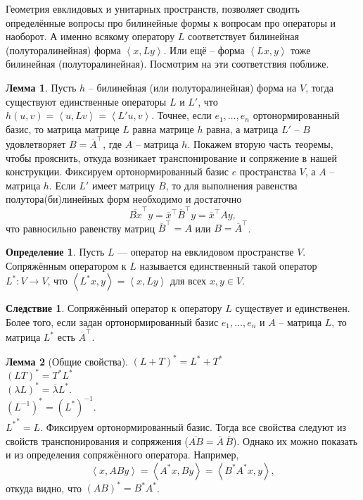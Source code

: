 \documentclass[10pt,a4paper,oneside]{book} %
\theoremstyle{definition}
\newtheorem*{defn}{Определение}
\newtheorem{lem}{Лемма}
\newtheorem{cor}{Следствие}
\newcommand{\ovl}{\overline}
\def\lan{\left\langle }
\def\ran{\right\rangle}
\def\dfn{\begin{defn}}
\def\edfn{\end{defn}}
\def\lm{\begin{lem}}
\def\elm{\end{lem}}
\def\crl{\begin{cor}}
\def\ecrl{\end{cor}}
\begin{document}
Геометрия евклидовых и унитарных пространств, позволяет сводить определённые вопросы про билинейные формы к вопросам про операторы и наоборот. А именно всякому оператору $L$ соответствует билинейная (полуторалинейная) форма $\lan x,Ly\ran$. Или ещё -- форма $\lan Lx,y\ran$ тоже билинейная (полуторалинейная). Посмотрим на эти соответствия поближе.

\lm Пусть $h$ -- билинейная (или полуторалинейная) форма на $V$, тогда существуют единственные операторы $L$ и $L'$, что $h(u,v) = \lan u,Lv \ran= \lan L'u,v\ran $. Точнее, если $e_1,\dots,e_n$ ортонормированный базис, то матрица  матрице $L$ равна матрице $h$ равна, а матрица $L'$ -- $B$ удовлетворяет $B=\ovl{A}^{\top}$, где $A$ -- матрица $h$. 
\proof Покажем вторую часть теоремы, чтобы прояснить, откуда возникает транспонирование и сопряжение в нашей конструкции. Фиксируем ортонормированный базис $e$ пространства $V$, а $A$ -- матрица $h$. Если $L'$ имеет матрицу $B$, то для выполнения равенства полутора(би)линейных форм необходимо и достаточно  $$\ovl{Bx}^{\top}y=\ovl{x}^{\top}\ovl{B}^{\top}y=\ovl{x}^{\top}Ay,$$ 
что равносильно равенству матриц $\ovl{B}^{\top}=A$ или $B=\ovl{A}^{\top}$.
\endproof
\elm

\dfn Пусть $L$ --- оператор на евклидовом пространстве $V$. Сопряжённым оператором к $L$ называется единственный такой оператор $L^*\colon V \to V$, что $\lan L^*x,y\ran=\lan x,Ly \ran$ для всех $x,y \in V$.
\edfn

\crl Сопряжённый оператор к оператору $L$ существует и единственен. Более того, если задан ортонормированный базис $e_1,\dots,e_n$ и $A$ -- матрица $L$, то матрица $L^*$ есть $\ovl{A}^{\top}$.
\ecrl









\lm[Общие свойства]
$(L+T)^*=L^*+T^*$\\
$(LT)^*=T^*L^*$\\
$(\lambda L)^*=\ovl{\lambda}L^*$.\\
$(L^{-1})^*=(L^*)^{-1}$.\\
${L^*}^*=L$.
\proof Фиксируем ортонормированный базис. Тогда все свойства следуют из свойств транспонирования и сопряжения ($\ovl{AB} = \ovl{ A} \,\ovl{B}$).
Однако их можно показать и из определения сопряжённого оператора. Например,
$$\lan x, ABy\ran = \lan A^*x, By\ran = \lan B^*A^*x,y\ran,$$
откуда видно, что $(AB)^*=B^* A^*$. 
\endproof
\elm
\end{document}
